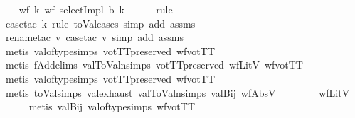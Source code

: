 \begin{isabellebody}
\isanewline
\ \ \isamarkupfalse%
\ wf{}{\isacharcolon}{\kern0pt}\ {\isachardoublequoteopen}{\isasymforall}k{\isachardot}{\kern0pt}\ wf\ {\isacharparenleft}{\kern0pt}selectImpl\ b\ k{\isacharparenright}{\kern0pt}{\isachardoublequoteclose}\isanewline
\ \ \ \ \isamarkupfalse%
\ rule\isanewline
\ \ \ \ \isamarkupfalse%
\ {\isacharparenleft}{\kern0pt}case{\isacharunderscore}{\kern0pt}tac\ k\ rule{\isacharcolon}{\kern0pt}\ toVal{}{}{}{}{\isachardot}{\kern0pt}cases{\isacharsemicolon}{\kern0pt}\ {\isacharparenleft}{\kern0pt}simp\ add{\isacharcolon}{\kern0pt}\ assms{\isacharparenright}{\kern0pt}{\isacharparenright}{\kern0pt}\isanewline
\ \ \ \ \isamarkupfalse%
\ {\isacharparenleft}{\kern0pt}rename{\isacharunderscore}{\kern0pt}tac\ v{\isacharcomma}{\kern0pt}\ case{\isacharunderscore}{\kern0pt}tac\ v{\isacharsemicolon}{\kern0pt}\ {\isacharparenleft}{\kern0pt}simp\ add{\isacharcolon}{\kern0pt}\ assms{\isacharparenright}{\kern0pt}{\isacharparenright}{\kern0pt}\isanewline
\ \ \ \ \isamarkupfalse%
\ {\isacharparenleft}{\kern0pt}metis\ val{\isacharunderscore}{\kern0pt}of{\isacharunderscore}{\kern0pt}type{\isachardot}{\kern0pt}simps\ votTTpreserved\ wfvotTT{\isacharparenright}{\kern0pt}\isanewline
\ \ \ \ \isamarkupfalse%
\ {\isacharparenleft}{\kern0pt}metis\ fAdd{}{\isachardot}{\kern0pt}elims\ val{}ToValn{\isachardot}{\kern0pt}simps{\isacharparenleft}{\kern0pt}{}{\isacharparenright}{\kern0pt}\ votTTpreserved\ wfLitV\ wfvotTT{\isacharparenright}{\kern0pt}\isanewline
\ \ \ \ \isamarkupfalse%
\ {\isacharparenleft}{\kern0pt}metis\ val{\isacharunderscore}{\kern0pt}of{\isacharunderscore}{\kern0pt}type{\isachardot}{\kern0pt}simps\ votTTpreserved\ wfvotTT{\isacharparenright}{\kern0pt}\isanewline
\ \ \ \ \isamarkupfalse%
\ {\isacharparenleft}{\kern0pt}metis\ toVal{}{}{}{}{\isachardot}{\kern0pt}simps{\isacharparenleft}{\kern0pt}{}{\isacharparenright}{\kern0pt}\ val{}{\isachardot}{\kern0pt}exhaust\ val{}ToValn{\isachardot}{\kern0pt}simps{\isacharparenleft}{\kern0pt}{}{\isacharparenright}{\kern0pt}\ valBij{}\ wfAbsV\isanewline
\ \ \ \ \ \ \ \ wfLitV{\isacharparenright}{\kern0pt}\isanewline
\ \ \ \ \isamarkupfalse%
\ {\isacharparenleft}{\kern0pt}metis\ valBij{}\ val{\isacharunderscore}{\kern0pt}of{\isacharunderscore}{\kern0pt}type{\isachardot}{\kern0pt}simps\ wfvotTT{\isacharparenright}{\kern0pt}{\isacharplus}{\kern0pt}\isanewline

\end{isabellebody}
